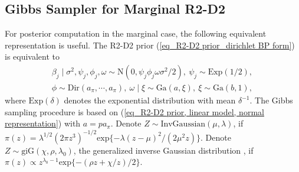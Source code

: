\documentclass[12pt]{article}
\begin{document}
\subsection{Gibbs Sampler for Marginal R2-D2}
For posterior computation in the marginal case, the following equivalent representation is useful.
The R2-D2 prior  (\ref{eq_R2-D2 prior_dirichlet BP form}) is  equivalent to
\begin{eqnarray} \label{eq_R2-D2 prior, linear model, normal representation}
\beta_j\mid\sigma^2, \psi_j, \phi_j, \omega   \sim   \text{N}(0,\psi_j\phi_j \omega\sigma^2/2),  \
\psi_j  \sim    \text{Exp}(1/2), \  \nonumber  \\
{\phi}  \sim \text{Dir}(a_\pi,\cdots,a_\pi),    \
\omega  \mid \xi     \sim  \text{Ga}(a,\xi),  \
\xi  \sim   \text{Ga}(b,1),
\end{eqnarray}
where $\text{Exp}(\delta)$ denotes the exponential distribution with mean $\delta^{-1}$.
The Gibbs sampling procedure  is    based on (\ref{eq_R2-D2 prior, linear model, normal representation}) with $a = pa_\pi$.  	Denote $Z\sim \text{InvGaussian}(\mu, \lambda)$,
if $ \pi(z) =  {\lambda^{1/2}(2\pi z^3)}^{-1/2}\text{exp}\{-  {\lambda(z-\mu)^2}/(2\mu^2z)\}$.
Denote $Z\sim\text{giG}(\chi,\rho,\lambda_0)$, the generalized inverse Gaussian distribution \citep{seshadri1997halphen}, if $\pi(z) \propto z^{\lambda_0-1}\text{exp}\{- (\rho z + \chi/z)/2\}$.
\end{document}
